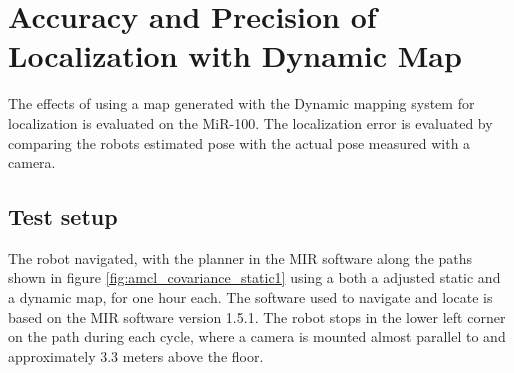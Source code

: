 \section{Accuracy and Precision of Localization with Dynamic Map}
The effects of using a map generated with the Dynamic mapping system for localization is evaluated on the MiR-100.
The localization error is evaluated by comparing the robots estimated pose with the actual pose measured with a camera. 

\subsection{Test setup} 
The robot navigated, with the planner in the MIR software along the paths shown in figure  \ref{fig:amcl_covariance_static1} using a both a adjusted static and a dynamic map, for one hour each.
The software used to navigate and locate is based on the MIR software version 1.5.1. 
The robot stops in the lower left corner on the path during each cycle, where a camera is mounted almost parallel to and approximately $3.3$ meters above the floor.

